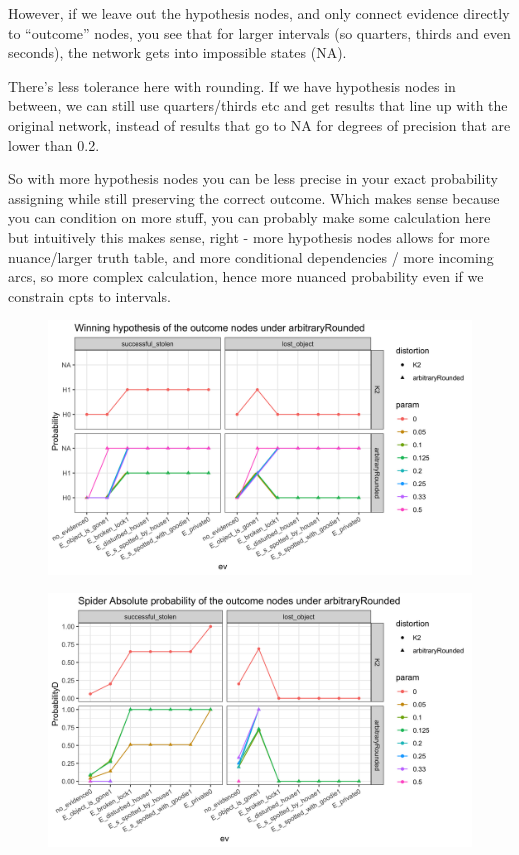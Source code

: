 \documentclass[11pt]{amsart}
\begin{document}
However, if we leave out the hypothesis nodes, and only connect evidence directly to ``outcome'' nodes, you see that for larger intervals (so quarters, thirds and even seconds), the network gets into impossible states (NA). 

There's less tolerance here with rounding. If we have hypothesis nodes in between, we can still use quarters/thirds etc and get results that line up with the original network, instead of results that go to NA for degrees of precision that are lower than 0.2.

So with more hypothesis nodes you can be less precise in your exact probability assigning while still preserving the correct outcome. Which makes sense because you can condition on more stuff, you can probably make some calculation here but intuitively this makes sense, right - more hypothesis nodes allows for more nuance/larger truth table, and more conditional dependencies / more incoming arcs, so more complex calculation, hence more nuanced probability even if we constrain cpts to intervals.

\begin{figure}[htbp]
\begin{center}
\includegraphics[scale=0.17]{images/arbitraryRoundedWeakSpider.png}
\label{default}
\end{center}
\end{figure}

\begin{figure}[htbp]
\begin{center}
\includegraphics[scale=0.17]{images/strongarbitraryRoundedspider.png}
\label{default}
\end{center}
\end{figure}
\end{document}
